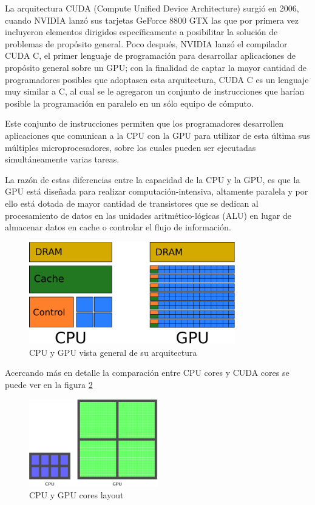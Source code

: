 La arquitectura CUDA (Compute Unified Device Architecture) surgió en 2006, 
cuando NVIDIA lanzó sus tarjetas GeForce 8800 GTX las que por primera vez 
incluyeron elementos dirigidos específicamente a posibilitar la solución de 
problemas de propósito general. Poco después, NVIDIA lanzó el compilador CUDA 
C, el primer lenguaje de programación para desarrollar aplicaciones de propósito 
general sobre un GPU; con la finalidad de captar la mayor cantidad de 
programadores posibles que adoptasen esta arquitectura, CUDA C es un lenguaje 
muy similar a C, al cual se le agregaron un conjunto de instrucciones que harían 
posible la programación en paralelo en un sólo equipo de cómputo.

Este conjunto de instrucciones permiten que los programadores desarrollen 
aplicaciones que comunican a la CPU con la GPU para utilizar de esta última sus 
múltiples microprocesadores, sobre los cuales pueden ser ejecutadas 
simultáneamente varias tareas.

La razón de estas diferencias entre la capacidad de la CPU y la GPU, es que la GPU está diseñada para realizar computación-intensiva, altamente paralela y por ello está dotada de mayor cantidad de transistores que se dedican al procesamiento de datos en las unidades aritmético-lógicas (ALU) en lugar de almacenar datos en cache o controlar el flujo de información.

\begin{figure}[h]
    \centering
    \includegraphics[width=0.8\textwidth]{images/cpu_gpu_arch.pdf}
    \caption{CPU y GPU vista general de su arquitectura}
    \label{fig:cpu_gpu_arch}
\end{figure}

Acercando más en detalle la comparación entre CPU cores y CUDA cores se puede ver en la figura \ref{fig:cpu_gpu}

\begin{figure}[h]
    \centering
    \includegraphics[width=0.5\textwidth]{images/cpu_gpu.pdf}
    \caption{CPU y GPU cores layout}
    \label{fig:cpu_gpu}
\end{figure}

